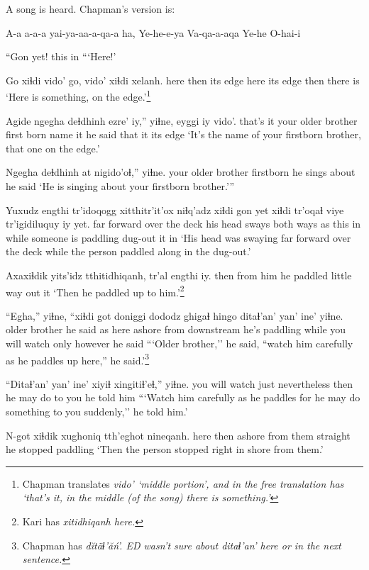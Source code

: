 \documentclass[12pt]{article}
\begin{document}
A song is heard. Chapman's version is:

A-a a-a-a yai-ya-aa-a-qa-a ha, Ye-he-e-ya Va-qa-a-aqa Ye-he O-hai-i

\gll ``Gon yet!
this in
\glt ```Here!'
\glend

\gll Go xiɬdi vido'  go, vido'  xiɬdi  xelanh.
here then {its edge} here {its edge} then  {there is}
\glt `Here is something, on the edge.'\footnote{Chapman translates \em vido' \em `middle portion', and in the free translation has `that's it, in the middle (of the song) there is something.'}
\glend

\gll Agide  ngegha  deɬdhinh ezre'  iy,'' yiɬne, eyggi iy vido'.
{that's it}  {your older brother} {first born} name it {he said} that  it {its edge}
\glt `It's the name of your firstborn brother, that one on the edge.'
\glend

\gll Ngegha deɬdhinh at nigido'oɬ,''  yiɬne.
{your older brother} firstborn {} {he sings about} {he said}
\glt `He is singing about your firstborn brother.'''
\glend

\gll Yuxudz engthi  tr'idoqogg xitthitr'it'ox  niɬq'adz xiɬdi gon yet xiɬdi tr'oqaɬ {viye tr'igidiluquy} iy yet.
far  forward {over the deck} {his head sways} {both ways} as this in while {someone is paddling} dug-out it in
\glt `His head was swaying far forward over the deck while the person paddled along in the dug-out.'
\glend

\gll Axaxiɬdik yits'idz tthitidhiqanh, tr'al  engthi  iy.
then  {from him} {he paddled} {little way} out  it
\glt `Then he paddled up to him.'\footnote{Kari has \em xitidhiqanh \em here.}
\glend

\gll ``Egha,'' yiɬne, ``xiɬdi got doniggi dododz  ghigaɬ hingo ditaɬ'an' yan' ine' yiɬne.
{older brother} {he said} as here ashore {from downstream} {he's paddling} while {you will watch} only however {he said}
\glt ```Older brother,'' he said, ``watch him carefully as he paddles up here,'' he said.'\footnote{Chapman has \em d\u{i}t\"aɬ'\u{a}\'n'. \em ED wasn't sure about \em ditaɬ'an' \em here or in the next sentence.}
\glend

\gll ``Ditaɬ'an' yan' ine'  xiyiɬ  xingitiɬ'eɬ,''  yiɬne.
{you will watch} just nevertheless then {he may do to you} {he told him}
\glt ```Watch him carefully as he paddles for he may do something to you suddenly,'' he told him.'
\glend

\gll N-got xiɬdik xughoniq  tth'eghot nineqanh.
here then {ashore from them} straight {he stopped paddling}
\glt `Then the person stopped right in shore from them.'
\glend
\end{document}
